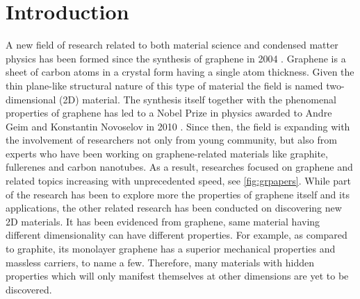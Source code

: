 
\chapter{Introduction \label{chap:1}}  %

\ifpdf
    \graphicspath{{Chapter1/Figs/Raster/}{Chapter1/Figs/PDF/}{Chapter1/Figs/}{Chapter1/Figs/Vector/}}
\else
    \graphicspath{{Chapter1/Figs/Vector/}{Chapter1/Figs/}}
\fi


A new field of research related to both material science and condensed matter physics has been formed since the synthesis of graphene in 2004 \cite{Novoselov666,Novoselov26072005}. Graphene is a sheet of carbon atoms in a crystal form having a single atom thickness. Given the thin plane-like structural nature of this type of material the field is named two-dimensional (2D) material. The synthesis itself together with the phenomenal properties of graphene has led to a Nobel Prize in physics awarded to Andre Geim and Konstantin Novoselov in 2010 \cite{Geim2007}. Since then, the field is expanding with the involvement of researchers not only from young community, but also from experts who have been working on graphene-related materials like graphite, fullerenes and carbon nanotubes. As a result, researches focused on graphene and related topics increasing with unprecedented speed, see \autoref{fig:grpapers}. While part of the research has been to explore more the properties of graphene itself and its applications, the other related research has been conducted on discovering new 2D materials. It has been evidenced from graphene, same material having different dimensionality can have different properties. For example, as compared to graphite, its monolayer graphene has a superior mechanical properties and massless carriers, to name a few. Therefore, many materials with hidden properties which will only manifest themselves at other dimensions are yet to be discovered. 



